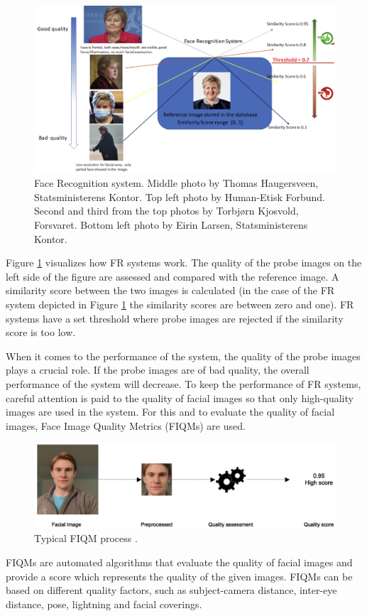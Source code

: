 \begin{figure}[h]
    \centering
    \includegraphics[scale = 0.4]{figures/Erna.png}
    \caption{Face Recognition system. Middle photo by Thomas Haugersveen, Statsministerens Kontor. Top left photo by Human-Etisk Forbund. Second and third from the top photos by Torbjørn Kjosvold, Forsvaret. Bottom left photo by Eirin Larsen, Statsministerens Kontor.}
    \label{fig:erna}
\end{figure}

Figure \ref{fig:erna} visualizes how FR systems work. The quality of the probe images on the left side of the figure are assessed and compared with the reference image. A similarity score between the two images is calculated (in the case of the FR system depicted in Figure \ref{fig:erna} the similarity scores are between zero and one). FR systems have a set threshold where probe images are rejected if the similarity score is too low. 

When it comes to the performance of the system, the quality of the probe images plays a crucial role. If the probe images are of bad quality, the overall performance of the system will decrease. To keep the performance of FR systems, careful attention is paid to the quality of facial images so that only high-quality images are used in the system. For this and to evaluate the quality of facial images, Face Image Quality Metrics (FIQMs) are used.
%
\begin{figure}[h]
    \centering
    \includegraphics[scale = 0.45]{figures/FIQM_process.png}
    \caption{Typical FIQM process \cite{FaceImageQualityAssessment}.}
    \label{fig:fiqm}
\end{figure}
%
FIQMs are automated algorithms that evaluate the quality of facial images and provide a score which represents the quality of the given images. FIQMs can be based on different quality factors, such as subject-camera distance, inter-eye distance, pose, lightning and facial coverings. %

